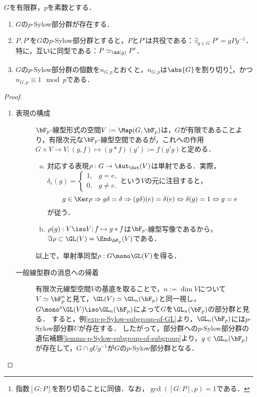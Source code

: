 \documentclass[uplatex,dvipdfmx]{jsreport}
\begin{document}
\begin{theorem}[Sylow (1872)]
    $G$を有限群，$p$を素数とする．
    \begin{enumerate}
        \item $G$の$p$-Sylow部分群が存在する．
        \item $P,P'$を$G$の$p$-Sylow部分群とすると，$P$と$P'$は共役である：$\exists_{g\in G}\;P'=gPg^{-1}$．特に，互いに同型である：$P\simeq_{\Ad(g)}P'$．
        \item $G$の$p$-Sylow部分群の個数を$n_{G,p}$とおくと，$n_{G,p}$は$\abs{G}$を割り切り\footnote{指数$[G:P]$を割り切ることに同値．なお，$\gcd([G:P],p)=1$である．}，かつ$n_{G,p}\equiv1\mod p$である．
    \end{enumerate}
\end{theorem}
\begin{proof}\mbox{}
    \begin{enumerate}
        \item \begin{description}
            \item[表現の構成] $\bF_p$-線型形式の空間$V:=\Map(G,\bF_p)$は，$G$が有限であることより，有限次元な$\bF_p$-線型空間であるが，これへの作用$G\times V\to V;(g,f)\mapsto (g*f)(g'):=f(g'g)$と定める．
            \begin{enumerate}[(a)]
                \item 対応する表現$\rho:G\to\Aut_\Set(V)$は単射である．実際，$\delta_e(g)=\begin{cases}1,&g=e,\\0,&g\ne e.\end{cases}$という$V$の元に注目すると，\[g\in\Ker\rho\Rightarrow g\delta=\delta\Rightarrow(g\delta)(e)=\delta(e)\Leftrightarrow\delta(g)=1\Leftrightarrow g=e\]
                が従う．
                \item $\rho(g):V\iso V;f\mapsto g*f$は$\bF_p$-線型写像であるから，$\Im\rho\subset\GL(V)=\End_{\bF_p}(V)$である．
            \end{enumerate}
            以上で，単射準同型$\rho:G\mono\GL(V)$を得る．
            \item[一般線型群の消息への帰着]
            有限次元線型空間$V$の基底を取ることで，$n:=\dim V$について$V\simeq\bF_p^n$と見て，$\GL(V)\simeq\GL_n(\bF_p)$と同一視し，$G\mono^\rho\GL(V)\iso\GL_n(\bF_p)$によって$G$を$\GL_n(\bF_p)$の部分群と見る．
            すると，例\ref{exp-p-Sylow-subgroup-of-GL}より，$\GL_n(\bF_p)$には$p$-Sylow部分群$U$が存在する．
            したがって，部分群への$p$-Sylow部分群の遺伝補題\ref{lemma-p-Sylow-subgroup-of-subgroup}より，$g\in\GL_n(\bF_p)$が存在して，$G\cap gUg^{-1}$が$G$の$p$-Sylow部分群となる．

\end{description}
\end{enumerate}
\end{proof}
\end{document}
